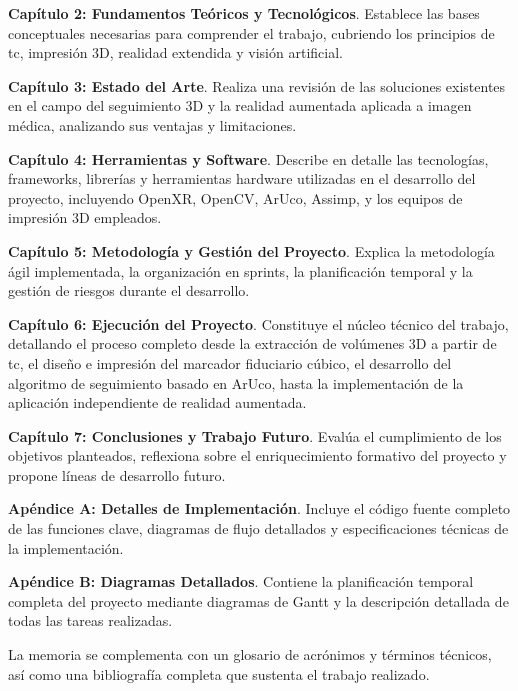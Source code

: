 \textbf{Capítulo 2: Fundamentos Teóricos y Tecnológicos}. Establece las bases conceptuales necesarias para comprender el trabajo, cubriendo los principios de \acrfull{tc}, impresión 3D, realidad extendida y visión artificial.

\textbf{Capítulo 3: Estado del Arte}. Realiza una revisión de las soluciones existentes en el campo del seguimiento 3D y la realidad aumentada aplicada a imagen médica, analizando sus ventajas y limitaciones.

\textbf{Capítulo 4: Herramientas y Software}. Describe en detalle las tecnologías, frameworks, librerías y herramientas hardware utilizadas en el desarrollo del proyecto, incluyendo OpenXR, OpenCV, ArUco, Assimp, y los equipos de impresión 3D empleados.

\textbf{Capítulo 5: Metodología y Gestión del Proyecto}. Explica la metodología ágil implementada, la organización en sprints, la planificación temporal y la gestión de riesgos durante el desarrollo.

\textbf{Capítulo 6: Ejecución del Proyecto}. Constituye el núcleo técnico del trabajo, detallando el proceso completo desde la extracción de volúmenes 3D a partir de \gls{tc}, el diseño e impresión del marcador fiduciario cúbico, el desarrollo del algoritmo de seguimiento basado en ArUco, hasta la implementación de la aplicación independiente de realidad aumentada.

\textbf{Capítulo 7: Conclusiones y Trabajo Futuro}. Evalúa el cumplimiento de los objetivos planteados, reflexiona sobre el enriquecimiento formativo del proyecto y propone líneas de desarrollo futuro.

\textbf{Apéndice A: Detalles de Implementación}. Incluye el código fuente completo de las funciones clave, diagramas de flujo detallados y especificaciones técnicas de la implementación.

\textbf{Apéndice B: Diagramas Detallados}. Contiene la planificación temporal completa del proyecto mediante diagramas de Gantt y la descripción detallada de todas las tareas realizadas.

La memoria se complementa con un glosario de acrónimos y términos técnicos, así como una bibliografía completa que sustenta el trabajo realizado.
